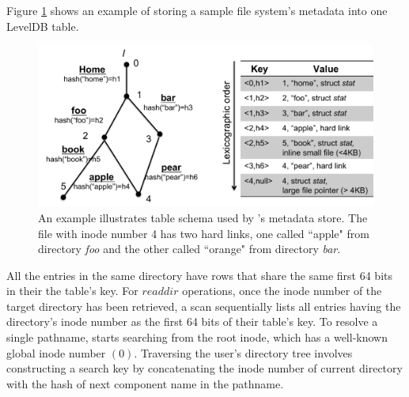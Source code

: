 Figure \ref{fig:schema} shows an example of storing a sample file system's metadata into one LevelDB table.
\begin{figure}[!ht]
\centering
\includegraphics[scale=0.35]{figs/schema}
\caption{An example illustrates table schema used by \tfs's metadata store.
         The file with inode number 4 has two hard links,
         one called ``apple" from directory \textit{foo} and 
         the other called ``orange" from directory \textit{bar}.}
\label{fig:schema}
\end{figure}

All the entries in the same directory have rows that 
share the same first 64 bits in their the table's key.
For $readdir$ operations, once the inode number
of the target directory has been retrieved, 
a scan sequentially lists all entries having 
the directory's inode number as the first 64 bits of their table's key. 
To resolve a single pathname, \tfs starts searching from the root inode, 
which has a well-known global inode number $(0)$.
Traversing the user's directory tree
involves constructing a search key by concatenating the inode 
number of current directory with the hash of
next component name in the pathname.
